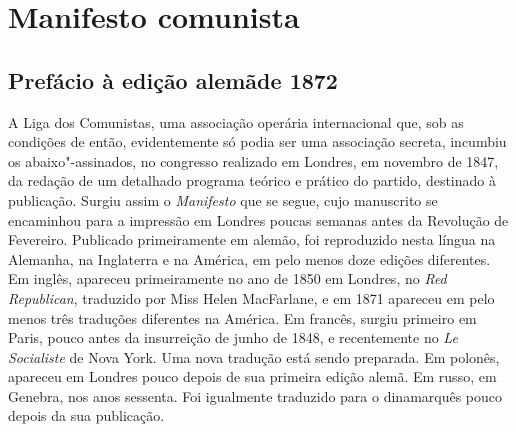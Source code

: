 \part{Manifesto comunista}

\chapter[Prefácio à edição alemã de 1872]{Prefácio à edição alemã\break de 1872}

A Liga dos Comunistas, uma associação operária internacional que, sob as
condições de então, evidentemente só podia ser uma associação secreta,
incumbiu os abaixo"-assinados, no congresso realizado em Londres, em
novembro de 1847, da redação de um detalhado programa teórico e prático
do partido, destinado à publicação. Surgiu assim o \textit{Manifesto}
que se segue, cujo manuscrito se encaminhou para a impressão em Londres
poucas semanas antes da Revolução de Fevereiro. Publicado primeiramente
em alemão, foi reproduzido nesta língua na Alemanha, na Inglaterra e na
América, em pelo menos doze edições diferentes. Em inglês, apareceu
primeiramente no ano de 1850 em Londres, no \textit{Red Republican},
traduzido por Miss Helen MacFarlane, e em 1871 apareceu em pelo menos
três traduções diferentes na América. Em francês, surgiu primeiro em
Paris, pouco antes da insurreição de junho de 1848, e recentemente no
\textit{Le Socialiste} de Nova York. Uma nova tradução está sendo
preparada. Em polonês, apareceu em Londres pouco depois de sua primeira
edição alemã. Em russo, em Genebra, nos anos sessenta. Foi igualmente
traduzido para o dinamarquês pouco depois da sua publicação.

